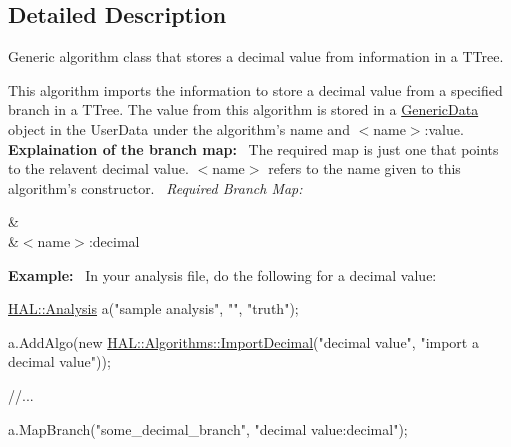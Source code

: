 \subsection{Detailed Description}
Generic algorithm class that stores a decimal value from information in a T\+Tree. 

This algorithm imports the information to store a decimal value from a specified branch in a T\+Tree. The value from this algorithm is stored in a \hyperlink{class_h_a_l_1_1_generic_data}{Generic\+Data} object in the User\+Data under the algorithm's name and $<$name$>$\+:value.~\newline
~\newline
{\bfseries Explaination of the branch map\+:}~\newline
The required map is just one that points to the relavent decimal value. $<$name$>$ refers to the name given to this algorithm's constructor.~\newline
{\itshape Required Branch Map\+:} \begin{TabularC}{2}
\hline
{}&\PBS{}\\
&\PBS\centering $<$name$>$\+:decimal \\
\end{TabularC}
{\bfseries Example\+:}~\newline
In your analysis file, do the following for a decimal value\+:


\begin{DoxyCode}
\hyperlink{class_h_a_l_1_1_analysis}{HAL::Analysis} a(\textcolor{stringliteral}{"sample analysis"}, \textcolor{stringliteral}{""}, \textcolor{stringliteral}{"truth"});

a.AddAlgo(\textcolor{keyword}{new} \hyperlink{class_h_a_l_1_1_algorithms_1_1_import_decimal}{HAL::Algorithms::ImportDecimal}(\textcolor{stringliteral}{"decimal value"}, \textcolor{stringliteral}{"import a
       decimal value"}));

\textcolor{comment}{//...}

a.MapBranch(\textcolor{stringliteral}{"some\_decimal\_branch"}, \textcolor{stringliteral}{"decimal value:decimal"});
\end{DoxyCode}
 

